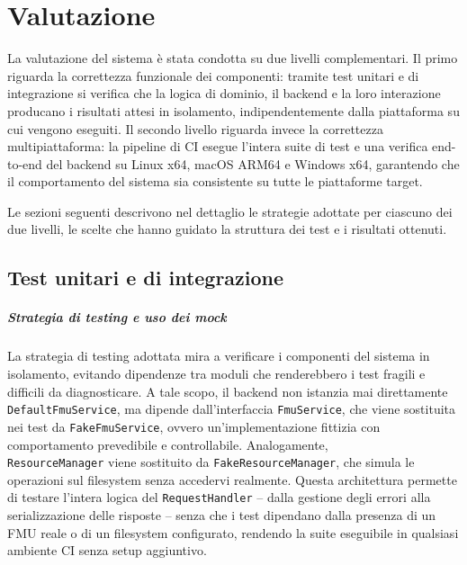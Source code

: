 \chapter{Valutazione}
\label{chap:valutazione}

La valutazione del sistema è stata condotta su due livelli complementari. Il primo riguarda la correttezza funzionale dei componenti: tramite test unitari e di integrazione si verifica che la logica di dominio, il backend e la loro interazione producano i risultati attesi in isolamento, indipendentemente dalla piattaforma su cui vengono eseguiti. Il secondo livello riguarda invece la correttezza multipiattaforma: la pipeline di CI esegue l'intera suite di test e una verifica end-to-end del backend su Linux x64, macOS ARM64 e Windows x64, garantendo che il comportamento del sistema sia consistente su tutte le piattaforme target.

Le sezioni seguenti descrivono nel dettaglio le strategie adottate per ciascuno dei due livelli, le scelte che hanno guidato la struttura dei test e i risultati ottenuti.

\section{Test unitari e di integrazione}
\label{sec:val-test}

\paragraph{Strategia di testing e uso dei mock}

La strategia di testing adottata mira a verificare i componenti del sistema in isolamento, evitando dipendenze tra moduli che renderebbero i test fragili e difficili da diagnosticare. A tale scopo, il backend non istanzia mai direttamente \texttt{DefaultFmuService}, ma dipende dall'interfaccia \texttt{FmuService}, che viene sostituita nei test da \texttt{FakeFmuService}, ovvero un'imple\-mentazione fittizia con comportamento prevedibile e controllabile. Analogamente, \\\texttt{ResourceManager} viene sostituito da \texttt{FakeResourceManager}, che simula le operazioni sul filesystem senza accedervi realmente. Questa architettura permette di testare l'intera logica del \texttt{RequestHandler} -- dalla gestione degli errori alla serializzazione delle risposte -- senza che i test dipendano dalla presenza di un FMU reale o di un filesystem configurato, rendendo la suite eseguibile in qualsiasi ambiente CI senza setup aggiuntivo.


